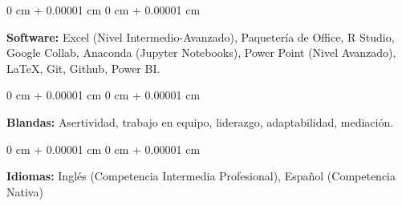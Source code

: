 \documentclass[10pt, letterpaper]{article}
\newenvironment{highlights}{
    \begin{itemize}[
        topsep=0.10 cm,
        parsep=0.10 cm,
        partopsep=0pt,
        itemsep=0pt,
        leftmargin=0 cm + 10pt
    ]
}{
    \end{itemize}
} %
\newenvironment{onecolentry}{
    \begin{adjustwidth}{
        0 cm + 0.00001 cm
    }{
        0 cm + 0.00001 cm
    }
}{
    \end{adjustwidth}
} %
\newenvironment{twocolentry}[2][]{
    \onecolentry
    \def\secondColumn{#2}
    \setcolumnwidth{\fill, 4.5 cm}
    \begin{paracol}{2}
}{
    \switchcolumn \raggedleft \secondColumn
    \end{paracol}
    \endonecolentry
} %
\begin{document}
        \vspace{0.2 cm}

        \begin{onecolentry}
            \textbf{Software:} Excel (Nivel Intermedio-Avanzado), Paquetería de Office, R Studio, Google Collab, Anaconda (Jupyter Notebooks), Power Point (Nivel Avanzado), LaTeX, Git, Github, Power BI.
        \end{onecolentry}

        \vspace{0.2 cm}

        \begin{onecolentry}
            \textbf{Blandas:} Asertividad, trabajo en equipo, liderazgo, adaptabilidad, mediación.
        \end{onecolentry}

        \vspace{0.2 cm}

        \begin{onecolentry}
            \textbf{Idiomas:} Inglés (Competencia Intermedia Profesional), Español (Competencia Nativa)
        \end{onecolentry}

        

\end{document}
